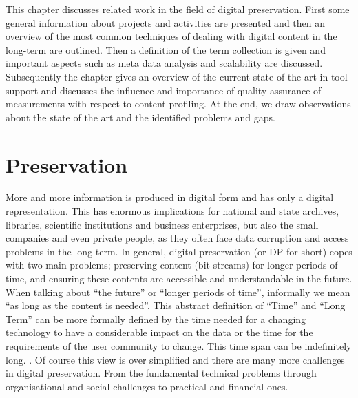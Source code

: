 This chapter discusses related work in the field of digital preservation.
First some general information about projects and activities are presented and then an overview of the most common techniques of dealing with digital content in the long-term are outlined.
Then a definition of the term collection is given and important aspects such as meta data analysis and scalability are discussed.
Subsequently the chapter gives an overview of the current state of the art in tool support and discusses the influence and importance of quality assurance of measurements with respect to content profiling.
At the end, we draw observations about the state of the art and the identified problems and gaps.

\section{Preservation}
More and more information is produced in digital form and has only a digital representation.
This has enormous implications for national and state archives, libraries, scientific institutions and business enterprises, but also the small companies and even private people, as they often face data corruption and access problems in the long term.
In general, digital preservation (or DP for short) copes with two main problems; preserving content (bit streams) for longer periods of time, and ensuring these contents are accessible and understandable in the future.
When talking about ``the future'' or ``longer periods of time'', informally we mean ``as long as the content is needed''. This abstract definition of ``Time'' and ``Long Term'' can be more formally defined by the time needed for a changing technology to have a considerable impact on the data or the time for the requirements of the user community to change. This time span can be indefinitely long. \cite{citeulike:1971545}.
Of course this view is over simplified and there are many more challenges in digital preservation.
From the fundamental technical problems through organisational and social challenges to practical and financial ones.

